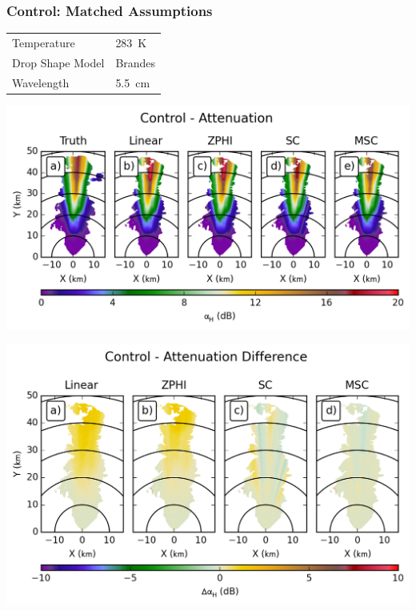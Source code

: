 \documentclass[red]{beamer}
\begin{document}
\begin{frame}
	\frametitle{Control: Matched Assumptions}
	\begin{center}
	    \begin{tabular}{ | l | l | }
	        \hline
	        Temperature & \SI{283}{\kelvin} \\
	        Drop Shape Model & Brandes \\
	        Wavelength & \SI{5.5}{\centi\meter} \\
			\hline
	    \end{tabular}
	\end{center}	
\end{frame}

\begin{frame}
    \begin{center}
        \includegraphics[scale=0.7]{figures/C_Control_Attenuation_H}
    \end{center}
\end{frame}

\begin{frame}
    \begin{center}
        \includegraphics[scale=0.7]{figures/C_Control_Attenuation_Difference_H}
    \end{center}
\end{frame}
\end{document}
